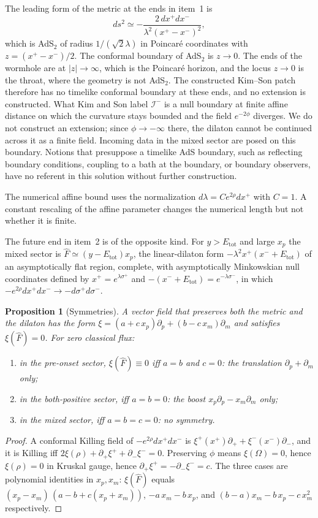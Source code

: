\documentclass[11pt]{article}
\newtheorem{proposition}{Proposition}
\theoremstyle{remark}
\newcommand{\Etot}{E_{\mathrm{tot}}}
\newcommand{\Fh}{\widehat F}
\begin{document}
The leading form of the metric at the ends in item~1 is
\[
ds^2\simeq-\frac{2\,dx^+dx^-}{\lambda^2(x^+-x^-)^2},
\]
which is AdS$_2$ of radius $1/(\sqrt2\lambda)$ in Poincar\'e coordinates with $z=(x^+-x^-)/2$. The conformal boundary of AdS$_2$ is $z\to0$. The ends of the wormhole are at $|z|\to\infty$, which is the Poincar\'e horizon, and the locus $z\to0$ is the throat, where the geometry is not AdS$_2$. The constructed Kim--Son patch therefore has no timelike conformal boundary at these ends, and no extension is constructed. What Kim and Son label $\mathcal I^-$ is a null boundary at finite affine distance on which the curvature stays bounded and the field $e^{-2\phi}$ diverges. We do not construct an extension; since $\phi\to-\infty$ there, the dilaton cannot be continued across it as a finite field. Incoming data in the mixed sector are posed on this boundary. Notions that presuppose a timelike AdS boundary, such as reflecting boundary conditions, coupling to a bath at the boundary, or boundary observers, have no referent in this solution without further construction.

The numerical affine bound uses the normalization $d\lambda=C e^{2\rho}dx^+$ with $C=1$. A constant rescaling of the affine parameter changes the numerical length but not whether it is finite.

The future end in item~2 is of the opposite kind. For $y>\Etot$ and large $x_p$ the mixed sector is $\Fh\simeq(y-\Etot)x_p$, the linear-dilaton form $-\lambda^2x^+(x^-+\Etot)$ of an asymptotically flat region, complete, with asymptotically Minkowskian null coordinates defined by $x^+=e^{\lambda\sigma^+}$ and $-(x^-+\Etot)=e^{-\lambda\sigma^-}$, in which $-e^{2\rho}dx^+dx^-\to-d\sigma^+d\sigma^-$.

\begin{proposition}[Symmetries]\label{prop:sym}
A vector field that preserves both the metric and the dilaton has the form $\xi=(a+c\,x_p)\partial_p+(b-c\,x_m)\partial_m$ and satisfies $\xi(\Fh)=0$. For zero classical flux:
\begin{enumerate}
\item in the pre-onset sector, $\xi(\Fh)\equiv0$ iff $a=b$ and $c=0$: the translation $\partial_p+\partial_m$ only;
\item in the both-positive sector, iff $a=b=0$: the boost $x_p\partial_p-x_m\partial_m$ only;
\item in the mixed sector, iff $a=b=c=0$: no symmetry.
\end{enumerate}
\end{proposition}
\begin{proof}
A conformal Killing field of $-e^{2\rho}dx^+dx^-$ is $\xi^+(x^+)\partial_++\xi^-(x^-)\partial_-$, and it is Killing iff $2\xi(\rho)+\partial_+\xi^++\partial_-\xi^-=0$. Preserving $\phi$ means $\xi(\Omega)=0$, hence $\xi(\rho)=0$ in Kruskal gauge, hence $\partial_+\xi^+=-\partial_-\xi^-=c$. The three cases are polynomial identities in $x_p,x_m$: $\xi(\Fh)$ equals $(x_p-x_m)\,(a-b+c(x_p+x_m))$, $-a\,x_m-b\,x_p$, and $(b-a)x_m-b\,x_p-c\,x_m^2$ respectively.
\end{proof}
\end{document}
